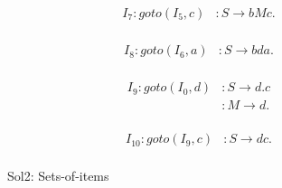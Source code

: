 \documentclass{article}
\begin{document}
\begin{figure}[h!]
\begin{multicols}{2}
\begin{equation*}
\begin{aligned}
I_7 : goto(I_5,c) &: S \rightarrow bMc.  \\
\end{aligned}
\end{equation*}

\begin{equation*}
\begin{aligned}
I_8 : goto(I_6,a) &: S \rightarrow bda.  \\
\end{aligned}
\end{equation*}

\begin{equation*}
\begin{aligned}
I_9 : goto(I_0,d) &: S \rightarrow d.c  \\
&: M \rightarrow d.  \\
\end{aligned}
\end{equation*}


\begin{equation*}
\begin{aligned}
I_{10} : goto(I_9,c) &: S \rightarrow dc.  \\
\end{aligned}
\end{equation*}
\end{multicols}
\caption{Sol2: Sets-of-items}
\label{soi}
\end{figure}
\end{document}
